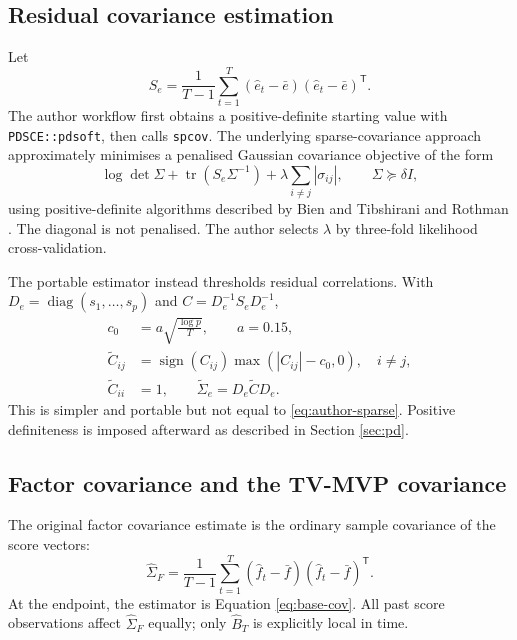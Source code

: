 \documentclass[11pt,a4paper]{article}
\newcommand{\wh}{\widehat}
\newcommand{\trans}{^{\mathsf T}}
\newcommand{\code}[1]{\texttt{#1}}
\begin{document}
\subsection{Residual covariance estimation}

Let
\begin{equation}
 S_e=\frac{1}{T-1}\sum_{t=1}^T(\wh e_t-\bar e)(\wh e_t-\bar e)\trans.
\end{equation}
The author workflow first obtains a positive-definite starting value with \code{PDSCE::pdsoft}, then calls \code{spcov}. The underlying sparse-covariance approach approximately minimises a penalised Gaussian covariance objective of the form
\begin{equation}
 \log\det\Sigma+\operatorname{tr}(S_e\Sigma^{-1})
 +\lambda\sum_{i\ne j}|\sigma_{ij}|,
 \qquad \Sigma\succeq\delta I,
 \label{eq:author-sparse}
\end{equation}
using positive-definite algorithms described by Bien and Tibshirani and Rothman \cite{bientib2011,rothman2012}. The diagonal is not penalised. The author selects $\lambda$ by three-fold likelihood cross-validation.

The portable estimator instead thresholds residual correlations. With $D_e=\operatorname{diag}(s_1,\ldots,s_p)$ and $C=D_e^{-1}S_eD_e^{-1}$,
\begin{align}
 c_0&=a\sqrt{\frac{\log p}{T}},\qquad a=0.15,\\
 \widetilde C_{ij}&=\operatorname{sign}(C_{ij})\max(|C_{ij}|-c_0,0),\quad i\ne j,\\
 \widetilde C_{ii}&=1,\qquad \widetilde\Sigma_e=D_e\widetilde C D_e.
 \label{eq:soft-threshold}
\end{align}
This is simpler and portable but not equal to \eqref{eq:author-sparse}. Positive definiteness is imposed afterward as described in Section \ref{sec:pd}.

\subsection{Factor covariance and the TV-MVP covariance}

The original factor covariance estimate is the ordinary sample covariance of the score vectors:
\begin{equation}
 \wh\Sigma_F=\frac{1}{T-1}\sum_{t=1}^T(\wh f_t-\bar f)(\wh f_t-\bar f)\trans.
\end{equation}
At the endpoint, the estimator is Equation \eqref{eq:base-cov}. All past score observations affect $\wh\Sigma_F$ equally; only $\wh B_T$ is explicitly local in time.
\end{document}
